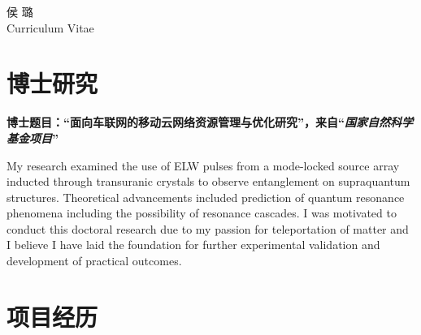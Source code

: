 \documentclass[10pt]{article} %
\begin{document}
\begin{paracol}{2} %
	
	
	\parbox[top][0.12\textheight][c]{\linewidth}{ %
		\vspace{-0.04\textheight} %
		\centering %
		{\Huge \fzblack 侯 璐}\\\medskip %
		{\Huge\color{headings}\cvtextfont Curriculum Vitae}
	}
	
	\fzblack
	\section{博士研究}
	
	{\raggedright\textbf{博士题目：``面向车联网的移动云网络资源管理与优化研究''，来自``\textit{国家自然科学基金项目}''}\\\medskip}
	
	My research examined the use of ELW pulses from a mode-locked source array inducted through transuranic crystals to observe entanglement on supraquantum structures. Theoretical advancements included prediction of quantum resonance phenomena including the possibility of resonance cascades. I was motivated to conduct this doctoral research due to my passion for teleportation of matter and I believe I have laid the foundation for further experimental validation and development of practical outcomes.
	
	\medskip %
	
	
	\section{项目经历}
	

\end{paracol}
\end{document}
